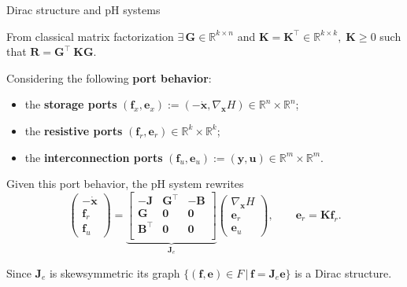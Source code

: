 \documentclass[aspectratio=169]{beamer}
\newcommand{\bbR}{\mathbb{R}}
\begin{document}
\begin{frame}{Dirac structure and pH systems}
	
	From classical matrix factorization $\exists \, \mathbf{G} \in \bbR^{k \times n}$ and $\mathbf{K} = \mathbf{K}^\top \in \bbR^{k \times k}, \; \mathbf{K} \ge 0$ such that $\mathbf{R} = \mathbf{G}^\top ~ \mathbf{K} \mathbf{G}$. \\
	\vspace{.2cm}
	
	\begin{tcolorbox}[nobeforeafter, colframe=theme,title=Dirac structure representation]%
			Considering the following \textbf{port behavior}:
		\begin{itemize}
			\item
			the \textbf{storage ports} $(\mathbf{f}_{{x}}, \mathbf{e}_{{x}}) := \left(-\dot{\mathbf{x}}, \nabla_{\mathbf{x}} H \right) \in \mathbb{R}^n \times \mathbb{R}^n$;
			\item
			the \textbf{resistive ports} $(\mathbf{f}_{r}, \mathbf{e}_{r}) \in \mathbb{R}^k \times \mathbb{R}^k$;
			\item
			the \textbf{interconnection ports} $(\mathbf{f}_{{u}}, \mathbf{e}_{{u}}) := (\mathbf{y}, \mathbf{u} ) \in \mathbb{R}^m \times \mathbb{R}^m$.
		\end{itemize}
		Given this port behavior, the pH system rewrites
		\begin{equation*}
			\begin{pmatrix}
				-\dot{\mathbf{x}} \\
				\mathbf{f}_{r} \\
				\mathbf{f}_{u}
			\end{pmatrix}
			=
			\underbrace{\begin{bmatrix}
					-\mathbf{J}	& \mathbf{G}^\top	& -\mathbf{B} \\
					\mathbf{G} 	& \mathbf{0}		& \mathbf{0} \\
					\mathbf{B}^\top	& \mathbf{0}	& \mathbf{0} \\
			\end{bmatrix}}_{\mathbf{J}_e}
			\begin{pmatrix}
				\nabla_{\mathbf{x}} H\\
				\mathbf{e}_{r}\\
				\mathbf{e}_{u}
			\end{pmatrix}, \qquad \mathbf{e}_{r} = \mathbf{K} \mathbf{f}_{r}.
		\end{equation*}
		
		Since $\mathbf{J}_e$ is skewsymmetric its graph $\{(\mathbf{f}, \mathbf{e}) \in F \, |\, \mathbf{f}=\mathbf{J}_e \mathbf{e}\}$ is a Dirac structure.
	\end{tcolorbox} 
	
\end{frame}
\end{document}
